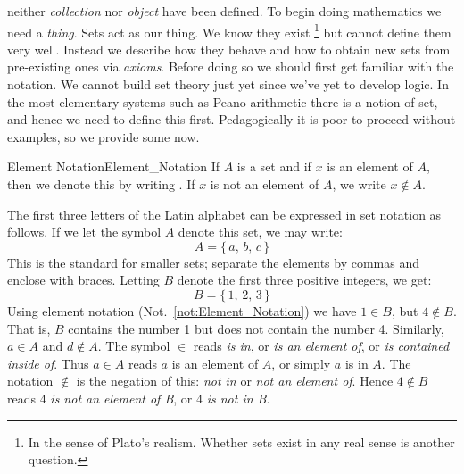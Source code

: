         neither \textit{collection} nor \textit{object} have been defined. To
        begin doing mathematics we need a \textit{thing}. Sets act as our thing.
        We know they exist%
        \footnote{%
            In the sense of Plato's realism.%
            Whether sets exist in any real sense is another question.
        }
        but cannot define them very well. Instead we describe how they behave
        and how to obtain new sets from pre-existing ones via \textit{axioms}.
        Before doing so we should first get familiar with the notation. We
        cannot build set theory just yet since we've yet to develop logic. In
        the most elementary systems such as Peano arithmetic there is a notion
        of set, and hence we need to define this first. Pedagogically it is poor
        to proceed without examples, so we provide some now.
        \begin{fnotation}{Element Notation}{Element_Notation}
            If $A$ is a \gls{set} and if $x$ is an element
            of $A$, then we denote this by writing
            . If $x$ is not an element
            of $A$, we write $x\notin{A}$.%
        \end{fnotation}
        \begin{example}
            The first three letters of the Latin alphabet can be expressed in
            set notation as follows. If we let the symbol $A$ denote this set, we
            may write:
            \begin{equation}
                A=\{\,a,\,b,\,c\,\}
            \end{equation}
            This is the standard for smaller sets; separate the elements by
            commas and enclose with braces. Letting $B$ denote the first three
            positive integers, we get:
            \begin{equation}
                B=\{\,1,\,2,\,3\,\}
            \end{equation}
            Using element notation (Not.~\ref{not:Element_Notation}) we have
            $1\in{B}$, but $4\notin{B}$. That is, $B$ contains the number 1 but
            does not contain the number 4. Similarly, $a\in{A}$ and
            $d\notin{A}$. The symbol $\in$ reads \textit{is in}, or
            \textit{is an element of}, or \textit{is contained inside of}. Thus
            $a\in{A}$ reads $a$ is an element of $A$, or simply $a$ is in $A$.
            The notation $\notin$ is the negation of this: \textit{not in} or
            \textit{not an element of}. Hence $4\notin{B}$ reads
            4\textit{ is not an element of B}, or 4\textit{ is not in B}.
        \end{example}

